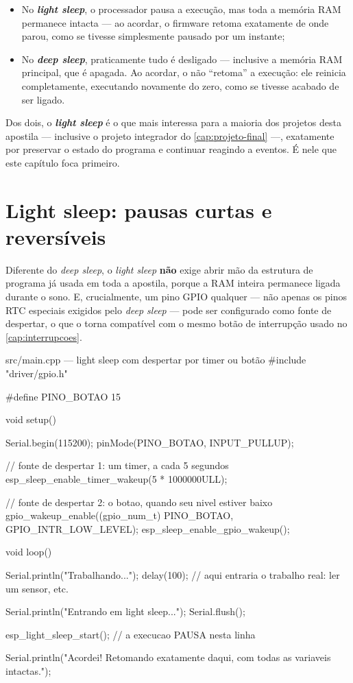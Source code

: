 \begin{itemize}
    \item No \textbf{\emph{light sleep}}, o processador pausa a execução, mas toda a memória RAM permanece intacta — ao acordar, o firmware retoma exatamente de onde parou, como se  tivesse simplesmente pausado por um instante;
    \item No \textbf{\emph{deep sleep}}, praticamente tudo é desligado — inclusive a memória RAM principal, que é apagada. Ao acordar, o \ESP{} não ``retoma'' a execução: ele reinicia completamente, executando  novamente do zero, como se tivesse acabado de ser ligado.
\end{itemize}

Dos dois, o \textbf{\emph{light sleep}} é o que mais interessa para a maioria dos projetos desta apostila — inclusive o projeto integrador do \cref{cap:projeto-final} —, exatamente por preservar o estado do programa e continuar reagindo a eventos. É nele que este capítulo foca primeiro.

\section{Light sleep: pausas curtas e reversíveis}
\label{sec:light-sleep}

Diferente do \emph{deep sleep}, o \emph{light sleep} \textbf{não} exige abrir mão da estrutura de programa já usada em toda a apostila, porque a RAM inteira permanece ligada durante o sono. E, crucialmente, um pino GPIO qualquer — não apenas os pinos RTC especiais exigidos pelo \emph{deep sleep} — pode ser configurado como fonte de despertar, o que o torna compatível com o mesmo botão de interrupção usado no \cref{cap:interrupcoes}.

\begin{codigoc}{src/main.cpp — light sleep com despertar por timer ou botão}
#include "driver/gpio.h"

#define PINO_BOTAO 15

void setup() {
    Serial.begin(115200);
    pinMode(PINO_BOTAO, INPUT_PULLUP);

    // fonte de despertar 1: um timer, a cada 5 segundos
    esp_sleep_enable_timer_wakeup(5 * 1000000ULL);

    // fonte de despertar 2: o botao, quando seu nivel estiver baixo
    gpio_wakeup_enable((gpio_num_t) PINO_BOTAO, GPIO_INTR_LOW_LEVEL);
    esp_sleep_enable_gpio_wakeup();
}

void loop() {
    Serial.println("Trabalhando...");
    delay(100);   // aqui entraria o trabalho real: ler um sensor, etc.

    Serial.println("Entrando em light sleep...");
    Serial.flush();

    esp_light_sleep_start();   // a execucao PAUSA nesta linha

    Serial.println("Acordei! Retomando exatamente daqui, com todas as variaveis intactas.");
}
\end{codigoc}

